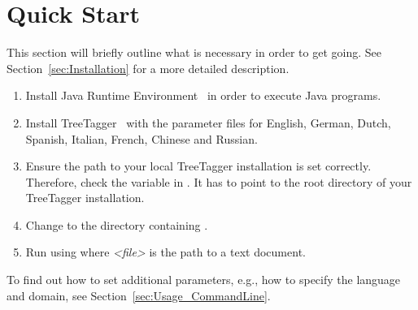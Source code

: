 \section{Quick Start}\label{sec:QuickStart}
This section will briefly outline what is necessary in order to get \product{} going. See Section~\ref{sec:Installation} for a more detailed description.
\begin{enumerate}
\item Install Java Runtime Environment~\cite{Java} in order to execute Java programs.
\item Install TreeTagger~\cite{Schmid1994} with the parameter files for English, German, Dutch, Spanish, Italian, French, Chinese and Russian.
\item Ensure the path to your local TreeTagger installation is set correctly. Therefore, check the variable  in \configFile{}. It has to point to the root directory of your TreeTagger installation.
\item Change to the directory containing \executableFile{}.
\item Run \product{} using \newline {} \newline where \emph{<file>} is the path to a text document.
\end{enumerate}

To find out how to set additional parameters, e.g., how to specify the language and domain, see Section~\ref{sec:Usage_CommandLine}.